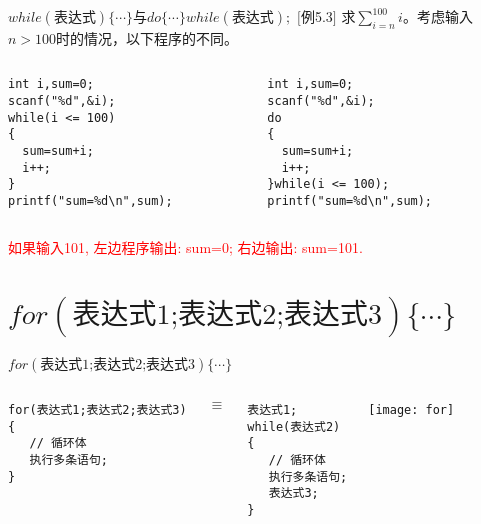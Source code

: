 \begin{frame}{$while(\text{表达式})\{ \cdots\}$与$do \{\cdots\} while(\text{表达式});$}
$[$例5.3$]$ 求$\sum\limits_{i=n}^{100}i$。考虑输入$n>100$时的情况，以下程序的不同。
\begin{columns}
\begin{lstlisting}[frame=single]
int i,sum=0;
scanf("%d",&i);      
while(i <= 100)     
{                   
  sum=sum+i;          
  i++;               
}                  
printf("sum=%d\n",sum);               
\end{lstlisting}
\begin{lstlisting}[frame=single]
int i,sum=0;
scanf("%d",&i); 
do     
{                   
  sum=sum+i;          
  i++;                
}while(i <= 100);   
printf("sum=%d\n",sum);                
\end{lstlisting}
\end{columns}

\vspace{0.2cm}
\qquad \textcolor{red}{如果输入101, 左边程序输出: sum=0; 右边输出: sum=101.}
\end{frame}

\section{$for(\text{表达式1;表达式2;表达式3}) \{\cdots\}$}

\begin{frame}{$for(\text{表达式1;表达式2;表达式3}) \{\cdots\}$}
\vspace{-0.3cm}
\begin{columns}
\begin{lstlisting}[frame=single] 
for(表达式1;表达式2;表达式3)
{
   // 循环体
   执行多条语句;  
}
\end{lstlisting}
\vspace{-0.2cm}
$\equiv$
\begin{lstlisting}[frame=single] 
表达式1;
while(表达式2)
{
   // 循环体
   执行多条语句;
   表达式3;  
}
\end{lstlisting}
\texttt{[image: for]}
\end{columns}
\end{frame}


